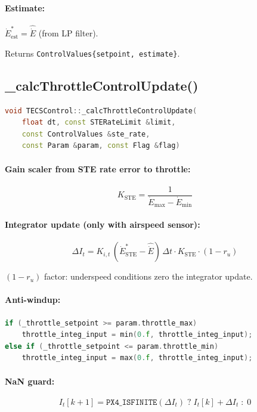 \documentclass[12pt,a4paper]{article}
\begin{document}
\paragraph{Estimate:}
$\dot{E}^*_{\text{est}} = \hat{\dot{E}}$ (from LP filter).

Returns \texttt{ControlValues\{setpoint, estimate\}}.

\subsection{\_calcThrottleControlUpdate()}

\begin{lstlisting}[language=C++]
void TECSControl::_calcThrottleControlUpdate(
    float dt, const STERateLimit &limit,
    const ControlValues &ste_rate,
    const Param &param, const Flag &flag)
\end{lstlisting}

\paragraph{Gain scaler from STE rate error to throttle:}
\begin{equation}
  K_{\text{STE}} = \frac{1}{\dot{E}_{\max} - \dot{E}_{\min}}
\end{equation}

\paragraph{Integrator update (only with airspeed sensor):}
\begin{equation}
  \Delta I_t = K_{i,t}\,(\dot{E}^*_{\text{STE}} - \hat{\dot{E}})\,\Delta t \cdot K_{\text{STE}} \cdot (1 - r_u)
\end{equation}

$(1 - r_u)$ factor: underspeed conditions zero the integrator update.

\paragraph{Anti-windup:}
\begin{lstlisting}[language=C++]
if (_throttle_setpoint >= param.throttle_max)
    throttle_integ_input = min(0.f, throttle_integ_input);
else if (_throttle_setpoint <= param.throttle_min)
    throttle_integ_input = max(0.f, throttle_integ_input);
\end{lstlisting}

\paragraph{NaN guard:}
\begin{equation}
  I_t[k+1] = \texttt{PX4\_ISFINITE}(\Delta I_t) \;?\;
    I_t[k] + \Delta I_t \;:\; 0
\end{equation}
\end{document}
